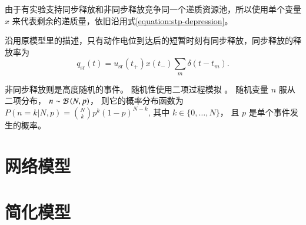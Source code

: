 由于有实验支持同步释放和非同步释放竞争同一个递质资源池\cite{Otsu2004,Wen2010}，所以使用单个变量 $x$ 来代表剩余的递质量，依旧沿用式\ref{equation:stp-depression}。

沿用原模型里的描述，只有动作电位到达后的短暂时刻有同步释放，同步释放的释放率为
\begin{equation}
q_\text{sr}(t) = u_\text{sr}(t_+)x(t_-)\sum_m \delta(t-t_m). \label{equation:sr-release}
\end{equation}

非同步释放则是高度随机的事件。
随机性使用二项过程模拟 \cite{DELCASTILLO1954}。
随机变量 $n$ 服从二项分布， $n\sim{\cal{B}}\left(N,p\right)$， 则它的概率分布函数为 $P(n=k|N,p) = \binom{N}{k} p^k (1-p)^{N-k}$, 其中 $k\in\{0,\ldots,N\}$， 且 $p$ 是单个事件发生的概率。



\section{网络模型}
\label{section:model:network-model}

\section{简化模型}
\label{section:model:simplified-model}
